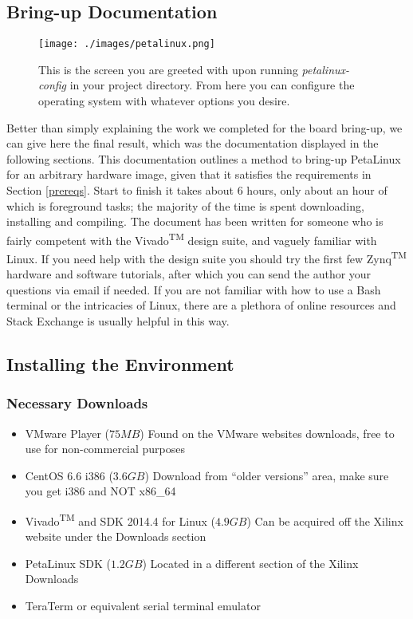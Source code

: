 \subsection{Bring-up Documentation}
\begin{figure}[H]
\centering
\texttt{[image: ./images/petalinux.png]}
\caption[PetaLinux Config Screen]{This is the screen you are greeted with upon running \textit{petalinux-config} in your project directory. From here you can configure the operating system with whatever options you desire.}
\label{petalinux}
\end{figure}
Better than simply explaining the work we completed for the board bring-up, we can give here the final result, which was the documentation displayed in the following sections. This documentation outlines a method to bring-up PetaLinux for an arbitrary hardware image, given that it satisfies the requirements in Section \ref{prereqs}. Start to finish it takes about 6 hours, only about an hour of which is foreground tasks; the majority of the time is spent downloading, installing and compiling. The document has been written for someone who is fairly competent with the Vivado\textsuperscript{TM} design suite, and vaguely familiar with Linux. If you need help with the design suite you should try the first few Zynq\textsuperscript{TM} hardware and software tutorials, after which you can send the author your questions via email if needed. If you are not familiar with how to use a Bash terminal or the intricacies of Linux, there are a plethora of online resources and Stack Exchange is usually helpful in this way.
\subsection{Installing the Environment}
\subsubsection{Necessary Downloads}
\begin{itemize}
\item VMware Player ($75 MB$)
\subitem Found on the VMware websites downloads, free to use for non-commercial purposes
\item CentOS 6.6 i386 ($3.6 GB$)
\subitem Download from ``older versions'' area, make sure you get i386 and NOT x86\_64
\item Vivado\textsuperscript{TM} and SDK 2014.4 for Linux ($4.9 GB$)
\subitem Can be acquired off the Xilinx website under the Downloads section
\item PetaLinux SDK ($1.2 GB$)
\subitem Located in a different section of the Xilinx Downloads
\item TeraTerm or equivalent serial terminal emulator
\end{itemize}

